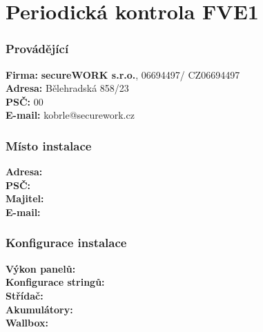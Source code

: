 \documentclass{book}
\newcommand{\zhotovitel}{secureWORK s.r.o.}
\newcommand{\zhotovitelIC}{06694497}
\newcommand{\zhotovitelUlice}{Bělehradská 858/23}
\newcommand{\zhotovitelPSC}{120 00}
\newcommand{\objednatel}{}
\newcommand{\objednatelEmail}{}
\newcommand{\objednatelInstalaceUlice}{}
\newcommand{\objednatelInstalaceMesto}{}
\newcommand{\objednatelInstalacePSC}{}
\newcommand{\vykonFVE}{}
\newcommand{\kapacitaBaterii}{}
\newcommand{\stridac}{}
\newcommand{\baterie}{}
\newcommand{\wallbox}{}
\newcommand{\pocetPaneluPoleAA}{}
\newcommand{\pocetPaneluPoleB}{} %
\begin{document}
 
	\chapter*{Periodická kontrola FVE1}
	

	\subsection*{Provádějící}		
	\begin{tabbing}
	\hspace{2em} \= \textbf{Firma:}\hspace{6em}  \= \textbf{\zhotovitel}, \zhotovitelIC / CZ\zhotovitelIC \\[0.3cm]
	\> \textbf{Adresa:} \>  \zhotovitelUlice\\[0.3cm]
	\> \textbf{PSČ:} \>  \zhotovitelPSC\\[0.3cm]
	\> \textbf{E-mail:} \>   kobrle@securework.cz\\
	\end{tabbing}
	

	\subsection*{Místo instalace}	
	
	\begin{tabbing}
	\hspace{2em} \= \textbf{Adresa:} \hspace{10em}  \= \objednatelInstalaceUlice \objednatelInstalaceMesto \\[0.3cm]
	\> \textbf{PSČ:} \>  \objednatelInstalacePSC \\[0.3cm]
	\> \textbf{Majitel:} \>   \objednatel \\[0.3cm]
	\> \textbf{E-mail:} \>   \objednatelEmail \\[0.3cm]
	\end{tabbing}
	
	\subsection*{Konfigurace instalace}	
	
	\begin{tabbing}
	\hspace{2em} \= \textbf{Výkon panelů:} \hspace{6em}  \= \vykonFVE \\[0.3cm]
	\> \textbf{Konfigurace stringů:} \>  \pocetPaneluPoleAA  \pocetPaneluPoleB \\[0.3cm]
	\> \textbf{Střídač:} \>  \stridac \\[0.3cm]
	\> \textbf{Akumulátory:} \>   \baterie \,  \kapacitaBaterii \\[0.3cm]
	\> \textbf{Wallbox:} \>   \wallbox \\[0.3cm]
	\end{tabbing}
	
\end{document}
